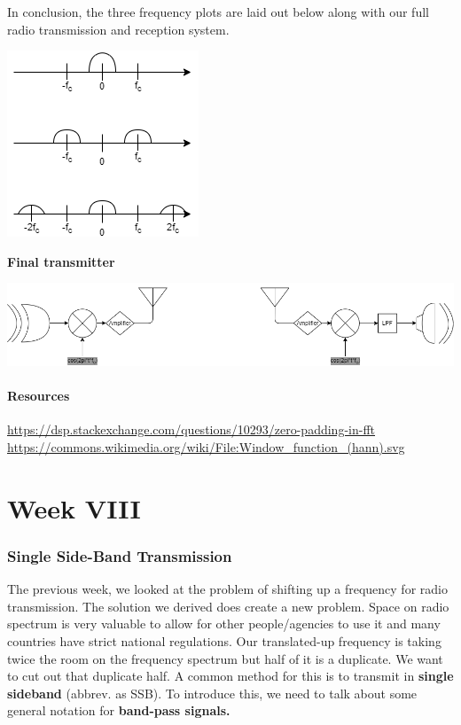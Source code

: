 \documentclass[12pt]{article}
\newcommand{\partcontent}{}
\begin{document}
In conclusion, the three frequency plots are laid out below along with our full radio transmission and reception system. 

\begin{center}
\includegraphics[scale=1]{freqshiftDrawing}
\end{center}

\textbf{Final transmitter}
\begin{center}
\includegraphics[scale=0.4]{radioTransmitSystem}
\end{center}


\subsection*{Resources}
\url{https://dsp.stackexchange.com/questions/10293/zero-padding-in-fft} \\
\url{https://commons.wikimedia.org/wiki/File:Window_function_(hann).svg}


\renewcommand\partcontent{Week VIII}
\part*{Week VIII}


\section{Single Side-Band Transmission}
The previous week, we looked at the problem of shifting up a frequency for radio transmission. The solution we derived does create a new problem. Space on radio spectrum is very valuable to allow for other people/agencies to use it and many countries have strict national regulations. Our translated-up frequency is taking twice the room on the frequency spectrum but half of it is a duplicate. We want to cut out that duplicate half. A common method for this is to transmit in \textbf{single sideband} (abbrev. as SSB). To introduce this, we need to talk about some general notation for \textbf{band-pass signals.}
\end{document}
